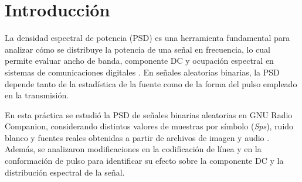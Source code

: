 \section{Introducción}

La densidad espectral de potencia (PSD) es una herramienta fundamental para analizar cómo se distribuye la potencia de una señal en frecuencia, lo cual permite evaluar ancho de banda, componente DC y ocupación espectral en sistemas de comunicaciones digitales \cite{ortega_reyes,proakis}. En señales aleatorias binarias, la PSD depende tanto de la estadística de la fuente como de la forma del pulso empleado en la transmisión.

En esta práctica se estudió la PSD de señales binarias aleatorias en GNU Radio Companion, considerando distintos valores de muestras por símbolo (\textit{Sps}), ruido blanco y fuentes reales obtenidas a partir de archivos de imagen y audio \cite{guia_lab3,gnuradio}. Además, se analizaron modificaciones en la codificación de línea y en la conformación de pulso para identificar su efecto sobre la componente DC y la distribución espectral de la señal.